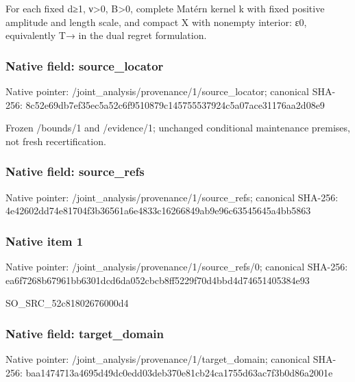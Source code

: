 \documentclass[10pt,a4paper]{article}
\begin{document}
\begingroup\raggedright\sloppy For each fixed d{\AtlasUnicodeSymbols ≥}\allowbreak{}1,\allowbreak{} {\AtlasUnicodeText ν}\allowbreak{}>0,\allowbreak{} B>0,\allowbreak{} complete Mat{\AtlasUnicodeText é}\allowbreak{}rn kernel k with fixed positive amplitude and length scale,\allowbreak{} and compact X with nonempty interior:\allowbreak{} {\AtlasUnicodeText ε}\allowbreak{}0,\allowbreak{} equivalently T{\AtlasUnicodeSymbols →}\allowbreak{} in the dual regret formulation.\par\endgroup

\subsubsection{Native field: source\_\allowbreak{}locator}
Native pointer: /joint\_\allowbreak{}analysis/provenance/1/source\_\allowbreak{}locator; canonical SHA-256: 8c52e69db7ef35ec5a52c6f9510879c145755537924c5a07ace31176aa2d08e9

\begingroup\raggedright\sloppy Frozen /\allowbreak{}bounds/\allowbreak{}1 and /\allowbreak{}evidence/\allowbreak{}1;\allowbreak{} unchanged conditional maintenance premises,\allowbreak{} not fresh recertification.\par\endgroup

\subsubsection{Native field: source\_\allowbreak{}refs}
Native pointer: /joint\_\allowbreak{}analysis/provenance/1/source\_\allowbreak{}refs; canonical SHA-256: 4e42602dd74e81704f3b36561a6e4833c16266849ab9e96c63545645a4bb5863

\subsubsection{Native item 1}
Native pointer: /joint\_\allowbreak{}analysis/provenance/1/source\_\allowbreak{}refs/0; canonical SHA-256: ea6f7268b67961bb6301dcd6da052cbcb8ff5229f70d4bbd4d74651405384e93

\begingroup\raggedright\sloppy SO\_\allowbreak{}SRC\_\allowbreak{}52c81802676000d4\par\endgroup

\subsubsection{Native field: target\_\allowbreak{}domain}
Native pointer: /joint\_\allowbreak{}analysis/provenance/1/target\_\allowbreak{}domain; canonical SHA-256: baa1474713a4695d49dc0edd03deb370e81cb24ca1755d63ac7f3b0d86a2001e
\end{document}

